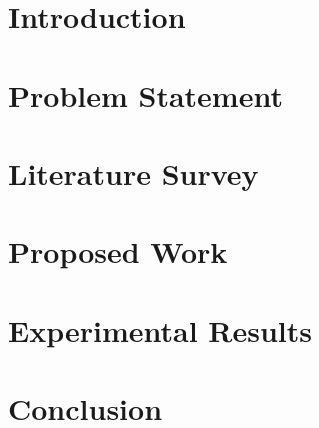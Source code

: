 \documentclass[12pt]{report}
\begin{document}
\printglossary[nonumberlist]


\chapter{Introduction}





\chapter{Problem Statement}



\chapter{Literature Survey}



\chapter{Proposed Work}



\chapter{Experimental Results}




\chapter{Conclusion}



\clearpage


\begin{thebibliography}{00}


\end{thebibliography}
\end{document}

